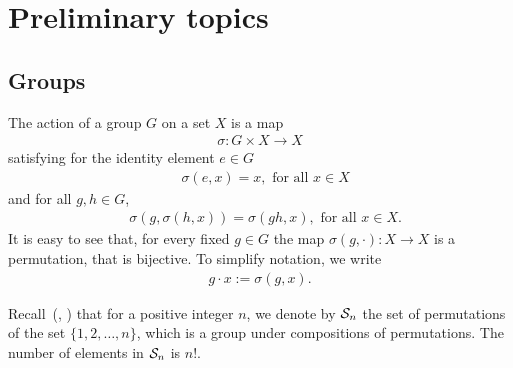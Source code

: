 \clearpage{\thispagestyle{empty}}
\section{Preliminary topics}

\subsection{Groups}


The action of a group $G$ on a set $X$ is a map
\begin{align*}
	\sigma : G \times X \rightarrow X
\end{align*}
satisfying for the identity element $e \in G$ 
\begin{align*}
	&\sigma(e,x) = x, \text{ for all $x \in X$}
\end{align*}
and for all $g,h \in G$,
\begin{align*}
	&\sigma (g, \sigma(h,x)) = \sigma(gh, x), \text{ for all } x \in X.
\end{align*}
It is easy to see that, for every fixed $g \in G$ the map $\sigma(g, \cdot): X \rightarrow X$ is a permutation, that is bijective. To simplify notation, we write
\begin{align*}
	g \cdot x := \sigma(g,x).
\end{align*}

%


Recall~(\cite[1.3.]{DummitFoote}, \cite[1.1]{Sagan}) that for a positive integer $n$, we denote by $\mathcal{S}_n$ the set of permutations of the set $\{1, 2, \dots, n\}$, which is a group under compositions of permutations. The number of elements in $\mathcal{S}_n$ is $n!$.

